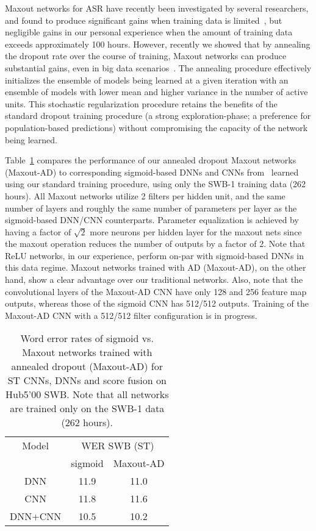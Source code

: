 \documentclass[a4paper]{article}
\begin{document}
Maxout networks for ASR have recently been investigated by several
researchers, and found to produce significant gains when training data
is limited~\cite{zhang14}, but negligible gains in our personal
experience when the amount of training data exceeds approximately 100
hours. However, recently we showed that by annealing the dropout rate
over the course of training, Maxout networks can produce substantial
gains, even in big data scenarios~\cite{rennie14}. The annealing
procedure effectively initializes the ensemble of models being learned
at a given iteration with an ensemble of models with lower mean and
higher variance in the number of active units. This stochastic
regularization procedure retains the benefits of the standard dropout
training procedure (a strong exploration-phase; a preference for
population-based predictions) without compromising the capacity of the
network being learned.

Table~\ref{maxout-tab} compares the performance of our annealed
dropout Maxout networks (Maxout-AD) to corresponding sigmoid-based
DNNs and CNNs from~\cite{soltau14} learned using our standard training
procedure, using only the SWB-1 training data (262 hours). All Maxout
networks utilize 2 filters per hidden unit, and the same number of
layers and roughly the same number of parameters per layer as the
sigmoid-based DNN/CNN counterparts. Parameter equalization is achieved
by having a factor of $\sqrt{2}$ more neurons per hidden layer for the
maxout nets since the maxout operation reduces the number of outputs
by a factor of 2. Note that ReLU networks, in our experience, perform
on-par with sigmoid-based DNNs in this data regime. Maxout networks
trained with AD (Maxout-AD), on the other hand, show a clear advantage
over our traditional networks. Also, note that the convolutional layers of the Maxout-AD CNN have only 128 and 256 feature map outputs, whereas those of the sigmoid CNN has 512/512 outputs. Training of the Maxout-AD CNN with a 512/512 filter configuration is in progress.

\begin{table}[htpb!]
\begin{center}
\begin{tabular}{|c|c|c|} \hline
Model   & \multicolumn{2}{|c|}{WER SWB (ST)}\\ \cline{2-3}
        & sigmoid & Maxout-AD\\ \hline
DNN     & 11.9     & 11.0     \\ \hline
CNN     & 11.8     & 11.6     \\ \hline
DNN+CNN & 10.5     & 10.2     \\ \hline
\end{tabular}
\end{center}
\caption{\label{maxout-tab}
Word error rates of sigmoid vs. Maxout networks trained with
annealed dropout (Maxout-AD) for ST CNNs, DNNs and score fusion on Hub5'00 SWB. Note that all networks are trained only on the SWB-1 data (262 hours). }
\end{table}
\end{document}
